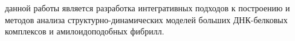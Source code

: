 



{\aim} данной работы является разработка интегративных подходов к построению и методов анализа структурно-динамических моделей больших ДНК-белковых комплексов и амилоидоподобных фибрилл. 



